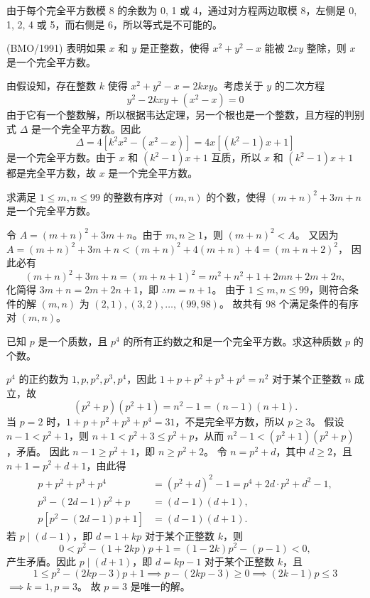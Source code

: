 \begin{questions}
\begin{solution}
由于每个完全平方数模 8 的余数为 0, 1 或 4，通过对方程两边取模 8，左侧是 0, 1, 2, 4 或 5，而右侧是 6，所以等式是不可能的。
\end{solution}

\question (BMO/1991) 表明如果 $x$ 和 $y$ 是正整数，使得 $x^2 + y^2 - x$ 能被 $2xy$ 整除，则 $x$ 是一个完全平方数。

\begin{solution}
由假设知，存在整数 $k$ 使得 $x^2 + y^2 - x = 2kxy$。考虑关于 $y$ 的二次方程
\[
y^2 - 2kxy + (x^2 - x) = 0
\]
由于它有一个整数解，所以根据韦达定理，另一个根也是一个整数，且方程的判别式 $\Delta$ 是一个完全平方数。因此
\[
\Delta = 4[k^2x^2 - (x^2 - x)] = 4x[(k^2 - 1)x + 1]
\]
是一个完全平方数。由于 $x$ 和 $(k^2 - 1)x + 1$ 互质，所以 $x$ 和 $(k^2 - 1)x + 1$ 都是完全平方数，故 $x$ 是一个完全平方数。
\end{solution}

\question 求满足 $1 \le m, n \le 99$ 的整数有序对 $(m, n)$ 的个数，使得 $(m + n)^2 + 3m + n$ 是一个完全平方数。
\begin{solution}
令 $A = (m + n)^2 + 3m + n$。由于 $m, n \ge 1$，则 $(m + n)^2 < A$。
又因为 $A = (m + n)^2 + 3m + n < (m + n)^2 + 4(m + n) + 4 = (m + n + 2)^2$，
因此必有
\[
(m + n)^2 + 3m + n = (m + n + 1)^2 = m^2 + n^2 + 1 + 2mn + 2m + 2n,
\]
化简得 $3m + n = 2m + 2n + 1$，即 $\therefore m = n + 1$。
由于 $1 \le m, n \le 99$，则符合条件的解 $(m, n)$ 为 $(2, 1), (3, 2), \dots, (99, 98)$。
故共有 98 个满足条件的有序对 $(m, n)$。
\end{solution}

\question 已知 $p$ 是一个质数，且 $p^4$ 的所有正约数之和是一个完全平方数。求这种质数 $p$ 的个数。
\begin{solution}
$p^4$ 的正约数为 $1, p, p^2, p^3, p^4$，因此 $1 + p + p^2 + p^3 + p^4 = n^2$ 对于某个正整数 $n$ 成立，故
\[
(p^2 + p)(p^2 + 1) = n^2 - 1 = (n - 1)(n + 1).
\]
当 $p = 2$ 时，$1 + p + p^2 + p^3 + p^4 = 31$，不是完全平方数，所以 $p \ge 3$。
假设 $n - 1 < p^2 + 1$，则 $n + 1 < p^2 + 3 \le p^2 + p$，从而 $n^2 - 1 < (p^2 + 1)(p^2 + p)$，矛盾。
因此 $n - 1 \ge p^2 + 1$，即 $n \ge p^2 + 2$。
令 $n = p^2 + d$，其中 $d \ge 2$，且 $n + 1 = p^2 + d + 1$，由此得
\begin{align*}
p + p^2 + p^3 + p^4 &= (p^2 + d)^2 - 1 = p^4 + 2d \cdot p^2 + d^2 - 1, \\
p^3 - (2d - 1)p^2 + p &= (d - 1)(d + 1), \\
p[p^2 - (2d - 1)p + 1] &= (d - 1)(d + 1).
\end{align*}
若 $p \mid (d - 1)$，即 $d = 1 + kp$ 对于某个正整数 $k$，则
\[
0 < p^2 - (1 + 2kp)p + 1 = (1 - 2k)p^2 - (p - 1) < 0,
\]
产生矛盾。因此 $p \mid (d + 1)$，即 $d = kp - 1$ 对于某个正整数 $k$，且
\[
1 \le p^2 - (2kp - 3)p + 1 \implies p - (2kp - 3) \ge 0 \implies (2k - 1)p \le 3
\]
$\implies k = 1, p = 3$。
故 $p = 3$ 是唯一的解。
\end{solution}


\end{questions}
